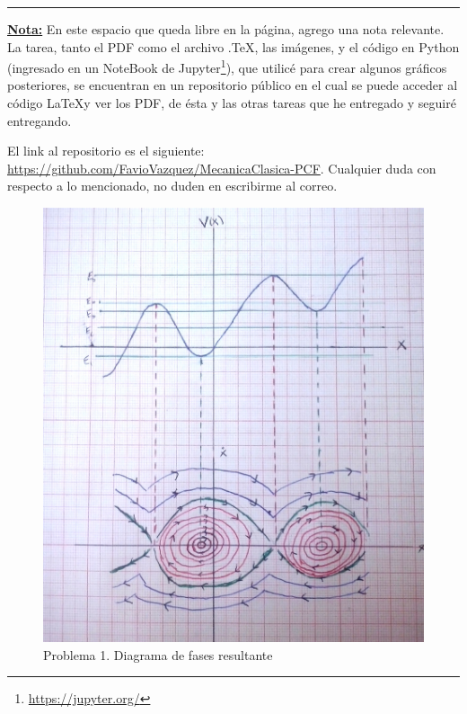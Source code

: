 \documentclass[a4paper,10pt]{article}
\numberwithin{equation}{section}
\begin{document}
\noindent\rule[0.5ex]{\linewidth}{1pt}

\underline{\textbf{Nota:}} En este espacio que queda libre en la página, agrego una nota relevante. La tarea, tanto 
el PDF como el archivo .\TeX , las imágenes, y el código en Python (ingresado en un 
NoteBook de Jupyter\footnote{\href{https://jupyter.org/}{https://jupyter.org/}}), que utilicé para crear algunos
gráficos posteriores, se encuentran en un repositorio público en el cual se puede acceder al código 
\LaTeX y ver los PDF, de ésta y las otras tareas que he entregado y seguiré entregando. 

\vspace{.3cm}

El link al repositorio es el siguiente: \href{https://github.com/FavioVazquez/MecanicaClasica-PCF}{https://github.com/FavioVazquez/MecanicaClasica-PCF}.
Cualquier duda con respecto a lo mencionado, no duden en escribirme al correo.

\begin{figure}[H]
 \center 
 \includegraphics[scale=0.2]{problema1fig2}
 \caption{Problema 1. Diagrama de fases resultante}
 \label{fig:diagramaFase}
\end{figure}
\end{document}
